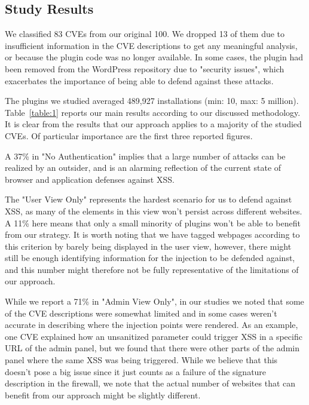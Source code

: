 \subsection{Study Results}

We classified 83 CVEs from our original 100. We dropped 13 of them due to insufficient information in the CVE descriptions to get any meaningful analysis, or because the plugin code was no longer available. In some cases, the plugin had been removed from the WordPress repository due to "security issues", which exacerbates the importance of being able to defend against these attacks.  

The plugins we studied averaged 489,927 installations (min: 10, max: 5 million). Table~\ref{table:1} reports our main results according to our discussed methodology. It is clear from the results that our approach applies to a majority of the studied CVEs. Of particular importance are the first three reported figures.

 A 37\% in "No Authentication" implies that a large number of attacks can be realized by an outsider, and is an alarming reflection of the current state of browser and application defenses against \ac{XSS}. 
 
 The "User View Only" represents the hardest scenario for us to defend against \ac{XSS}, as many of the elements in this view won't persist across different websites. A 11\% here means that only a small minority of plugins won't be able to benefit from our strategy. It is worth noting that we have tagged webpages according to this criterion by barely being displayed in the user view, however, there might still be enough identifying information for the injection  to be defended against, and this number might therefore not be fully representative of the limitations of our approach.
 
  While we report a 71\% in "Admin View Only", in our studies we noted that some of the CVE descriptions were somewhat limited and in some cases weren't accurate in describing where the injection points were rendered. As an example, one CVE explained how an unsanitized parameter could trigger \ac{XSS} in a specific URL of the admin panel, but we found that there were other parts of the admin panel where the same \ac{XSS} was being triggered. While we believe that this doesn't pose a big issue since it just counts as a failure of the signature description in the firewall, we note that the actual number of websites that can benefit from our approach might be slightly different. 
 

